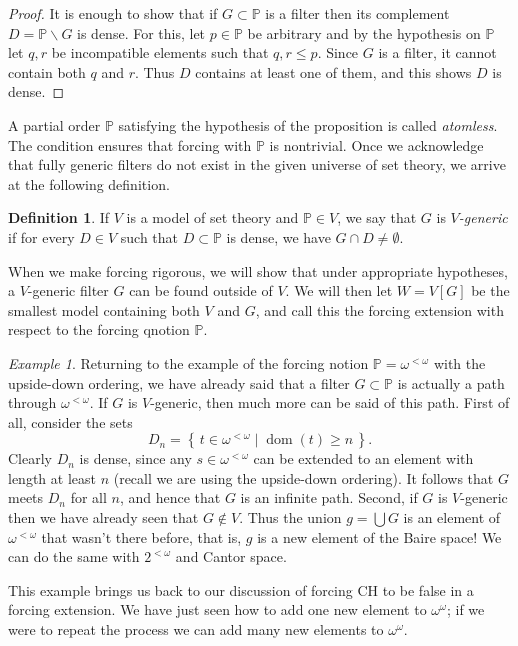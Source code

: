 \documentclass[11pt,oneside]{amsbook}
\newcommand{\set}[1]{\left\{\,#1\,\right\}}
\newcommand{\PP}{\mathbb P}
\DeclareMathOperator{\dom}{dom}
\theoremstyle{definition}
\theoremstyle{plain}
\theoremstyle{definition}
\newtheorem{definition}[theorem]{Definition}
\theoremstyle{remark}
\newtheorem{example}[theorem]{Example}
\numberwithin{equation}{section}
\numberwithin{figure}{section}
\begin{document}
\begin{proof}
  It is enough to show that if $G\subset\PP$ is a filter then its complement $D=\PP\smallsetminus G$ is dense. For this, let $p\in\PP$ be arbitrary and by the hypothesis on $\PP$ let $q,r$ be incompatible elements such that $q,r\leq p$. Since $G$ is a filter, it cannot contain both $q$ and $r$. Thus $D$ contains at least one of them, and this shows $D$ is dense.
\end{proof}

A partial order $\PP$ satisfying the hypothesis of the proposition is called \emph{atomless}. The condition ensures that forcing with $\PP$ is nontrivial. Once we acknowledge that fully generic filters do not exist in the given universe of set theory, we arrive at the following definition.

\begin{definition}
  If $V$ is a model of set theory and $\PP\in V$, we say that $G$ is \emph{$V$-generic} if for every $D\in V$ such that $D\subset\PP$ is dense, we have $G\cap D\neq\emptyset$.
\end{definition}

When we make forcing rigorous, we will show that under appropriate hypotheses, a $V$-generic filter $G$ can be found outside of $V$. We will then let $W=V[G]$ be the smallest model containing both $V$ and $G$, and call this the forcing extension with respect to the forcing qnotion $\PP$.

\begin{example}
  Returning to the example of the forcing notion $\PP=\omega^{<\omega}$ with the upside-down ordering, we have already said that a filter $G\subset\PP$ is actually a path through $\omega^{<\omega}$. If $G$ is $V$-generic, then much more can be said of this path. First of all, consider the sets
  \[D_n=\set{t\in\omega^{<\omega}\mid \dom(t)\geq n}\text{.}
  \]
  Clearly $D_n$ is dense, since any $s\in\omega^{<\omega}$ can be extended to an element with length at least $n$ (recall we are using the upside-down ordering). It follows that $G$ meets $D_n$ for all $n$, and hence that $G$ is an infinite path. Second, if $G$ is $V$-generic then we have already seen that $G\notin V$. Thus the union $g=\bigcup G$ is an element of $\omega^{<\omega}$ that wasn't there before, that is, $g$ is a new element of the Baire space! We can do the same with $2^{<\omega}$ and Cantor space.
\end{example}

This example brings us back to our discussion of forcing CH to be false in a forcing extension. We have just seen how to add one new element to $\omega^\omega$; if we were to repeat the process we can add many new elements to $\omega^\omega$.
\end{document}
